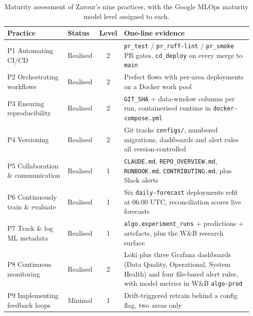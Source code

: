 \begin{table}[h]
  \centering
  \caption{Maturity assessment of Zarour's nine practices, with the Google MLOps maturity model level \cite{google_mlops_maturity} assigned to each.}
  \label{tab:maturity}
  \renewcommand{\arraystretch}{1.3}
  \begin{tabularx}{\linewidth}{@{}l l c >{\raggedright\arraybackslash}X@{}}
    \toprule
    \textbf{Practice} & \textbf{Status} & \textbf{Level} & \textbf{One-line evidence} \\
    \midrule
    P1 Automating CI/CD              & Realised & 2 & \texttt{pr\_test} / \texttt{pr\_ruff-lint} / \texttt{pr\_smoke} PR gates, \texttt{cd\_deploy} on every merge to \texttt{main} \\
    P2 Orchestrating workflows       & Realised & 2 & Prefect flows with per-area deployments on a Docker work pool \\
    P3 Ensuring reproducibility      & Realised & 2 & \texttt{GIT\_SHA} + data-window columns per run, containerised runtime in \texttt{docker-compose.yml} \\
    P4 Versioning                    & Realised & 2 & Git tracks \texttt{configs/}, numbered migrations, dashboards and alert rules all version-controlled \\
    P5 Collaboration \& communication & Realised & 1 & \texttt{CLAUDE.md}, \texttt{REPO\_OVERVIEW.md}, \texttt{RUNBOOK.md}, \texttt{CONTRIBUTING.md}, plus Slack alerts \\
    P6 Continuously train \& evaluate & Realised & 1 & Six \texttt{daily-forecast} deployments refit at 06:00 UTC, reconciliation scores live forecasts \\
    P7 Track \& log ML metadata      & Realised & 1 & \texttt{algo.experiment\_runs} + predictions + artefacts, plus the W\&B research surface \\
    P8 Continuous monitoring         & Realised & 2 & Loki plus three Grafana dashboards (Data Quality, Operational, System Health) and four file-based alert rules, with model metrics in W\&B \texttt{algo-prod} \\
    P9 Implementing feedback loops   & Minimal  & 1 & Drift-triggered retrain behind a config flag, two areas only \\
    \bottomrule
  \end{tabularx}
\end{table}

